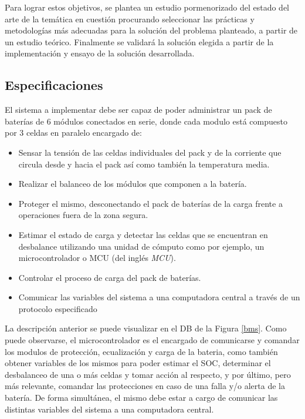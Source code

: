 \documentclass[10pt,a4paper]{article}
\begin{document}
\noindent Para lograr estos objetivos, se plantea un estudio pormenorizado 
del estado del arte de la temática en cuestión procurando seleccionar las 
prácticas y metodologías más adecuadas para la solución del problema 
planteado, a partir de un estudio teórico. Finalmente se validará la 
solución elegida a partir de la implementación y ensayo de la solución 
desarrollada.

\subsection{Especificaciones}

\noindent El sistema a implementar debe ser capaz de poder administrar un 
pack de bater\'ias de 6 m\'odulos conectados en serie, donde cada modulo est\'a 
compuesto por 3 celdas en paralelo encargado de: 

\begin{itemize}
    \item Sensar la tensión de las celdas individuales del pack y de la 
	corriente que circula desde y hacia el pack as\'i como tambi\'en 
	la temperatura media.
    \item Realizar el balanceo de los m\'odulos que componen a la bater\'ia.
    \item Proteger el mismo, desconectando el pack de bater\'ias de la carga
	frente a operaciones fuera de la zona segura.
    \item Estimar el estado de carga y detectar las celdas que se encuentran
	en desbalance utilizando una unidad de cómputo como por ejemplo, un
	microcontrolador o \acrshort{MCU} (del ingl\'es \emph{\acrlong{MCU}}).
    \item Controlar el proceso de carga del pack de bater\'ias.
    \item Comunicar las variables del sistema a una computadora central a
	trav\'es de un protocolo especificado
\end{itemize}

\noindent La descripción anterior se puede visualizar en el \acrfull{DB} de la
Figura \ref{bms}. Como puede observarse, el microcontrolador es el encargado de
comunicarse y comandar los modulos de protecci\'on, ecualizaci\'on y carga de 
la bateria, como tambi\'en obtener variables de los mismos para poder estimar 
el \acrshort{SOC}, determinar el desbalanceo de una o m\'as celdas y tomar 
acci\'on al respecto, y por último, pero m\'as relevante, comandar las 
protecciones en caso de una falla y/o alerta de la batería. 
De forma simult\'anea, el mismo debe estar a cargo de comunicar las distintas 
variables del sistema a una computadora central.
\end{document}
